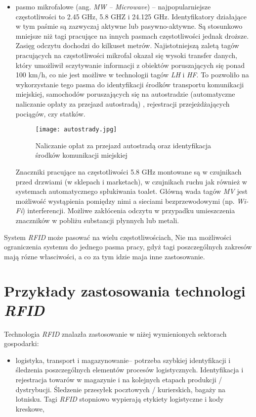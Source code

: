 \begin{itemize}
\begin{itemize}
\begin{itemize}
	\item pasmo mikrofalowe (ang. \emph{MW – Microwave}) – najpopularniejsze częstotliwości to 2.45 GHz, 5.8 GHZ i 24.125 GHz.  
Identyfikatory działające w tym paśmie są zazwyczaj aktywne lub pasywno-aktywne. Są stosunkowo mniejsze niż tagi pracujące na innych pasmach częstotliwości jednak droższe. Zasięg odczytu dochodzi do kilkuset metrów. Najistotniejszą zaletą tagów pracujących na częstotliwości mikrofal okazał się wysoki transfer danych, który  umożliwił sczytywanie informacji z obiektów poruszających się ponad 100 km/h, co nie jest możliwe w technologii tagów \emph{LH} i \emph{HF}.  To pozwoliło na wykorzystanie tego pasma do identyfikacji środków transportu komunikacji miejskiej, samochodów poruszających się  na autostradzie (automatyczne naliczanie opłaty za przejazd autostradą) , rejestracji przejeżdżających pociągów, czy statków.

	\begin{figure}[h!]
	\centering
	    \texttt{[image: autostrady.jpg]}
	    \caption{Naliczanie opłat za przejazd autostradą oraz identyfikacja środków komunikacji miejskiej}
	\end{figure}

	Znaczniki pracujące na częstotliwości 5.8 GHz montowane są w czujnikach przed drzwiami (w sklepach i marketach), w czujnikach ruchu jak również w systemach automatycznego spłukiwania toalet.
	Główną wada tagów \emph{MV} jest możliwość wystąpienia pomiędzy nimi a sieciami bezprzewodowymi (np. \emph{Wi-Fi}) interferencji. Możliwe zakłócenia odczytu w przypadku umieszczenia znaczników w pobliżu substancji płynnych lub metali.

\end{itemize}

System \emph{RFID} może pasować na wielu częstotliwościach, Nie ma możliwości ograniczenia systemu do jednego pasma pracy, gdyż tagi poszczególnych zakresów mają rózne własciwości, a co za tym idzie maja inne zastosowanie.

\newpage

\section{Przykłady zastosowania technologi \emph{RFID}}

Technologia \emph{RFID} znalazła zastosowanie w niżej wymienionych sektorach gospodarki: 

\begin{itemize}\setlength{\itemsep}{0pt}
	\item logistyka, transport i magazynowanie– potrzeba szybkiej identyfikacji i śledzenia poszczególnych elementów procesów logistycznych. Identyfikacja i rejestracja towarów w magazynie i na kolejnych etapach produkcji / dystrybucji.  Śledzenie przesyłek pocztowych / kurierskich, bagaży na lotnisku.  Tagi \emph{RFID} stopniowo wypierają etykiety logistyczne i kody kreskowe,


\end{itemize}
\end{itemize}
\end{itemize}
